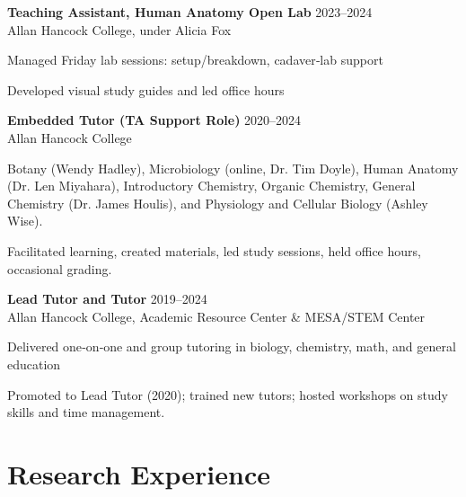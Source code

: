 \documentclass[letterpaper]{article}
\renewenvironment{itemize}{
  \begin{list}{}{
    \setlength{\leftmargin}{1.5em}
  }
}{
  \end{list}
}
\begin{document}
\begin{itemize}
  \item \textbf{Teaching Assistant, Human Anatomy Open Lab} \hfill 2023--2024 \\
    Allan Hancock College, under Alicia Fox  
    \begin{itemize}
      \item Managed Friday lab sessions: setup/breakdown, cadaver‐lab support  
      \item Developed visual study guides and led office hours
    \end{itemize}

  \item \textbf{Embedded Tutor (TA Support Role)} \hfill 2020--2024 \\
    Allan Hancock College  
    \begin{itemize}
      \item Botany (Wendy Hadley), Microbiology (online, Dr. Tim Doyle), Human Anatomy (Dr. Len Miyahara), Introductory Chemistry, Organic Chemistry, General Chemistry (Dr. James Houlis), and Physiology and Cellular Biology (Ashley Wise). 
      \item Facilitated learning, created materials, led study sessions, held office hours, occasional grading.
    \end{itemize}

  \item \textbf{Lead Tutor and Tutor} \hfill 2019--2024 \\
    Allan Hancock College, Academic Resource Center \& MESA/STEM Center  
    \begin{itemize}
      \item Delivered one‐on‐one and group tutoring in biology, chemistry, math, and general education  
      \item Promoted to Lead Tutor (2020); trained new tutors; hosted workshops on study skills and time management.
    \end{itemize}
\end{itemize}

\section*{Research Experience}
\end{document}
